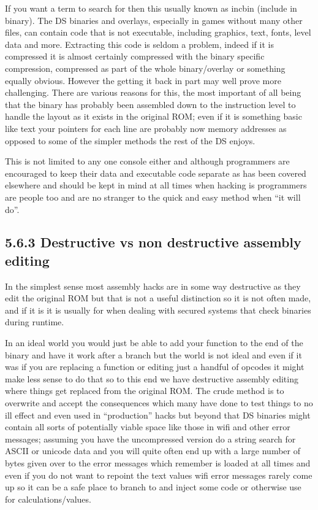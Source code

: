 \documentclass[
]{book}
\begin{document}
If you want a term to search for then this usually known as incbin (include in binary). The DS binaries and overlays, especially in games without many other files, can contain code that is not executable, including graphics, text, fonts, level data and more. Extracting this code is seldom a problem, indeed if it is compressed it is almost certainly compressed with the binary specific compression, compressed as part of the whole binary/overlay or something equally obvious. However the getting it back in part may well prove more challenging. There are various reasons for this, the most important of all being that the binary has probably been assembled down to the instruction level to handle the layout as it exists in the original ROM; even if it is something basic like text your pointers for each line are probably now memory addresses as opposed to some of the simpler methods the rest of the DS enjoys.

This is not limited to any one console either and although programmers are encouraged to keep their data and executable code separate as has been covered elsewhere and should be kept in mind at all times when hacking is programmers are people too and are no stranger to the quick and easy method when ``it will do''.

\hypertarget{destructive-vs-non-destructive-assembly-editing}{%
\subsection{5.6.3 Destructive vs non destructive assembly editing}\label{destructive-vs-non-destructive-assembly-editing}}

In the simplest sense most assembly hacks are in some way destructive as they edit the original ROM but that is not a useful distinction so it is not often made, and if it is it is usually for when dealing with secured systems that check binaries during runtime.

In an ideal world you would just be able to add your function to the end of the binary and have it work after a branch but the world is not ideal and even if it was if you are replacing a function or editing just a handful of opcodes it might make less sense to do that so to this end we have destructive assembly editing where things get replaced from the original ROM. The crude method is to overwrite and accept the consequences which many have done to test things to no ill effect and even used in ``production'' hacks but beyond that DS binaries might contain all sorts of potentially viable space like those in wifi and other error messages; assuming you have the uncompressed version do a string search for ASCII or unicode data and you will quite often end up with a large number of bytes given over to the error messages which remember is loaded at all times and even if you do not want to repoint the text values wifi error messages rarely come up so it can be a safe place to branch to and inject some code or otherwise use for calculations/values.
\end{document}
